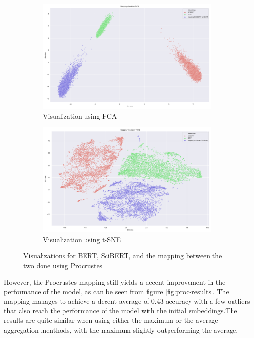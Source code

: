 \documentclass[12pt]{extreport}
\begin{document}
\begin{figure}[H]
\centering
\begin{subfigure}{.49\textwidth}
\centering
\includegraphics[width=\linewidth]{assets/addressing-change/mapping_vis_pca_SCIBERT_BERT_average.png}
\caption{Visualization using PCA}
\label{fig:proc-pca}
\end{subfigure}
\begin{subfigure}{.49\textwidth}
\centering
\includegraphics[width=\linewidth]{assets/addressing-change/mapping_vis_tsne_SCIBERT_BERT_average.png}
\caption{Visualization using t-SNE}
\label{fig:proc-tsne}
\end{subfigure}
\caption{Visualizations for BERT, SciBERT, and the mapping between the two done using Procrustes}
\label{fig:proc-viz}
\end{figure}

However, the Procrustes mapping still yields a decent improvement in the performance of the model, as can be seen from figure \ref{fig:proc-results}. The mapping manages to achieve a decent average of 0.43 accuracy with a few outliers that also reach the performance of the model with the initial embeddings.The results are quite similar when using either the maximum or the average aggregation menthods, with the maximum slightly outperforming the average.
\end{document}

